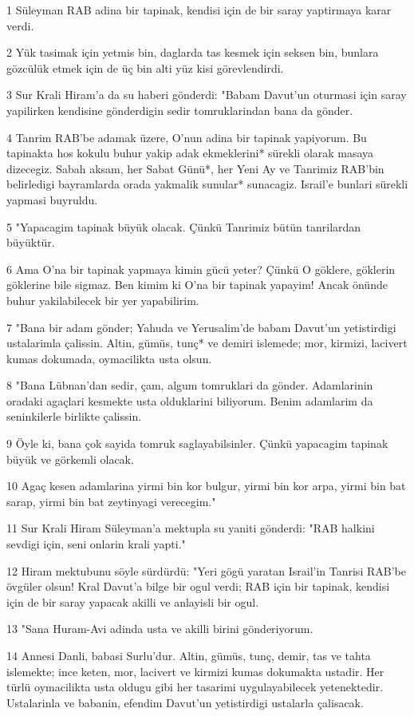 \par 1 Süleyman RAB adina bir tapinak, kendisi için de bir saray yaptirmaya karar verdi.
\par 2 Yük tasimak için yetmis bin, daglarda tas kesmek için seksen bin, bunlara gözcülük etmek için de üç bin alti yüz kisi görevlendirdi.
\par 3 Sur Krali Hiram'a da su haberi gönderdi: "Babam Davut'un oturmasi için saray yapilirken kendisine gönderdigin sedir tomruklarindan bana da gönder.
\par 4 Tanrim RAB'be adamak üzere, O'nun adina bir tapinak yapiyorum. Bu tapinakta hos kokulu buhur yakip adak ekmeklerini* sürekli olarak masaya dizecegiz. Sabah aksam, her Sabat Günü*, her Yeni Ay ve Tanrimiz RAB'bin belirledigi bayramlarda orada yakmalik sunular* sunacagiz. Israil'e bunlari sürekli yapmasi buyruldu.
\par 5 "Yapacagim tapinak büyük olacak. Çünkü Tanrimiz bütün tanrilardan büyüktür.
\par 6 Ama O'na bir tapinak yapmaya kimin gücü yeter? Çünkü O göklere, göklerin göklerine bile sigmaz. Ben kimim ki O'na bir tapinak yapayim! Ancak önünde buhur yakilabilecek bir yer yapabilirim.
\par 7 "Bana bir adam gönder; Yahuda ve Yerusalim'de babam Davut'un yetistirdigi ustalarimla çalissin. Altin, gümüs, tunç* ve demiri islemede; mor, kirmizi, lacivert kumas dokumada, oymacilikta usta olsun.
\par 8 "Bana Lübnan'dan sedir, çam, algum tomruklari da gönder. Adamlarinin oradaki agaçlari kesmekte usta olduklarini biliyorum. Benim adamlarim da seninkilerle birlikte çalissin.
\par 9 Öyle ki, bana çok sayida tomruk saglayabilsinler. Çünkü yapacagim tapinak büyük ve görkemli olacak.
\par 10 Agaç kesen adamlarina yirmi bin kor bulgur, yirmi bin kor arpa, yirmi bin bat sarap, yirmi bin bat zeytinyagi verecegim."
\par 11 Sur Krali Hiram Süleyman'a mektupla su yaniti gönderdi: "RAB halkini sevdigi için, seni onlarin krali yapti."
\par 12 Hiram mektubunu söyle sürdürdü: "Yeri gögü yaratan Israil'in Tanrisi RAB'be övgüler olsun! Kral Davut'a bilge bir ogul verdi; RAB için bir tapinak, kendisi için de bir saray yapacak akilli ve anlayisli bir ogul.
\par 13 "Sana Huram-Avi adinda usta ve akilli birini gönderiyorum.
\par 14 Annesi Danli, babasi Surlu'dur. Altin, gümüs, tunç, demir, tas ve tahta islemekte; ince keten, mor, lacivert ve kirmizi kumas dokumakta ustadir. Her türlü oymacilikta usta oldugu gibi her tasarimi uygulayabilecek yetenektedir. Ustalarinla ve babanin, efendim Davut'un yetistirdigi ustalarla çalisacak.
